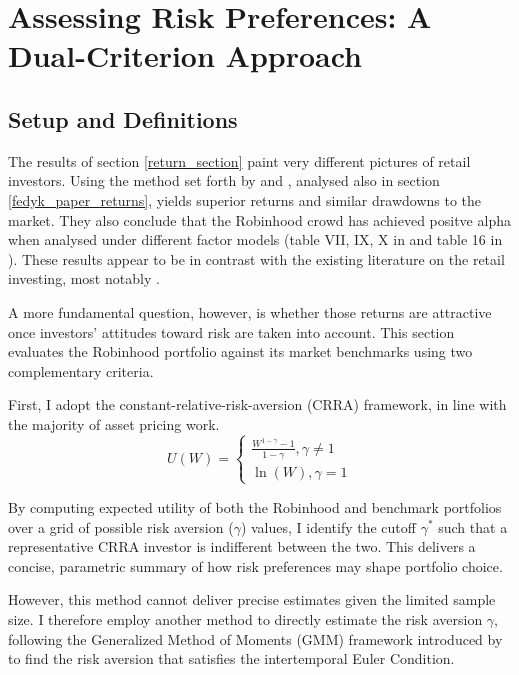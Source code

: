\section{Assessing Risk Preferences: A Dual-Criterion Approach}
\subsection{Setup and Definitions}
The results of section \ref{return_section} paint very different pictures of retail investors. 
Using the method set forth by \cite{Welch2022} and \cite{Fedyk2024}, analysed also in section \ref{fedyk_paper_returns}, yields superior returns and similar drawdowns to the market.
They also conclude that the Robinhood crowd has achieved positve alpha when analysed under different factor models (table VII, IX, X in \cite{Welch2022} and table 16 in \cite{Fedyk2024}). 
These results appear to be in contrast with the existing literature on the retail investing, most notably \cite{BarberOdean2000}.

A more fundamental question, however, is whether those returns are attractive once investors' attitudes toward risk are taken into account.
This section evaluates the Robinhood portfolio against its market benchmarks using two complementary criteria.

First, I adopt the constant-relative-risk-aversion (CRRA) framework, in line with the majority of asset pricing work.
\begin{equation}
    U(W) = 
    \begin{cases}
    \frac{W^{1-\gamma}-1}{1-\gamma}, \gamma\neq 1\\
    \ln(W), \gamma = 1
    \end{cases}
    \label{CRRA}
\end{equation}

By computing expected utility of both the Robinhood and benchmark portfolios over a grid of possible risk aversion ($\gamma$) values,
I identify the cutoff $\gamma^*$ such that a representative CRRA investor is indifferent between the two.
This delivers a concise, parametric summary of how risk preferences may shape portfolio choice.

However, this method cannot deliver precise estimates given the limited sample size. 
I therefore employ another method to directly estimate the risk aversion $\gamma$, 
following the Generalized Method of Moments (GMM) framework introduced by \cite{hansen1982generalized} to find the risk aversion that satisfies the intertemporal Euler Condition.

